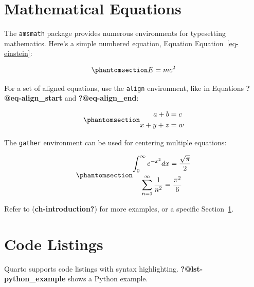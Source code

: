 \documentclass{article}
\begin{document}
\section{Mathematical Equations}\label{sec-equations}

The \texttt{amsmath} package provides numerous environments for
typesetting mathematics. Here's a simple numbered equation, Equation
Equation~\ref{eq-einstein}:

\begin{equation}\phantomsection\label{eq-einstein}{ E = mc^2 }\end{equation}

For a set of aligned equations, use the \texttt{align} environment, like
in Equations \textbf{?@eq-align\_start} and \textbf{?@eq-align\_end}:

\begin{equation}\phantomsection\label{eq-align}{
\begin{align}
    a + b &= c \label{eq:align_start} \\
    x + y + z &= w \label{eq:align_end}
\end{align}
}\end{equation}

The \texttt{gather} environment can be used for centering multiple
equations:

\begin{equation}\phantomsection\label{eq-gather}{
\begin{gather}
    \int_0^\infty e^{-x^2} dx = \frac{\sqrt{\pi}}{2} \label{eq:gaussian_integral} \\
    \sum_{n=1}^\infty \frac{1}{n^2} = \frac{\pi^2}{6} \label{eq:basel_problem}
\end{gather}
}\end{equation}

Refer to (\textbf{ch-introduction?}) for more examples, or a specific
Section~\ref{sec-equations}.

\section{Code Listings}\label{sec-code}

Quarto supports code listings with syntax highlighting.
\textbf{?@lst-python\_example} shows a Python example.

\begin{Shaded}
\begin{Highlighting}[]
    \NormalTok{(}\SpecialCharTok{\{}\SpecialCharTok{\}}\NormalTok{)}

\NormalTok{)}
\end{Highlighting}
\end{Shaded}
\end{document}
